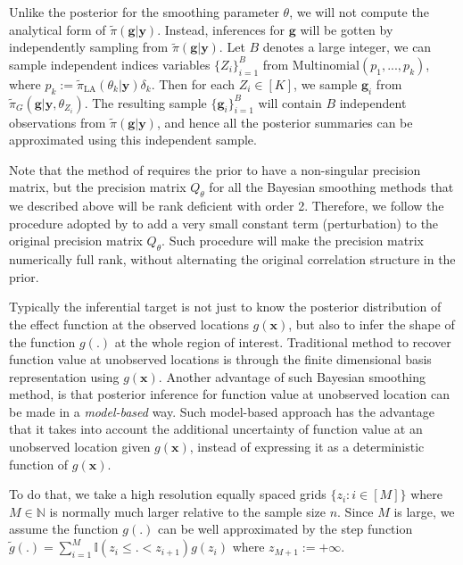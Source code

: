 \documentclass{article}
\begin{document}
Unlike the posterior for the smoothing parameter $\theta$, we will not compute the analytical form of $\tilde{\pi}(\boldsymbol{g}|\boldsymbol{y})$. Instead, inferences for $\boldsymbol{g}$ will be gotten by independently sampling from $\tilde{\pi}(\boldsymbol{g}|\boldsymbol{y})$. Let $B$ denotes a large integer, we can sample independent indices variables $\{Z_i\}_{i=1}^B$ from $\text{Multinomial}(p_1,...,p_k)$, where $p_k := \tilde{\pi}_\text{LA}(\theta_k|\boldsymbol{y}) \delta_k$. Then for each $Z_i \in [K]$, we sample $\boldsymbol{g}_i$ from $\tilde{\pi}_G(\boldsymbol{g}|\boldsymbol{y},\theta_{Z_i})$. The resulting sample $\{\boldsymbol{g}_i\}_{i=1}^B$ will contain $B$ independent observations from $\tilde{\pi}(\boldsymbol{g}|\boldsymbol{y})$, and hence all the posterior summaries can be approximated using this independent sample. 

Note that the method of \cite{tierney1986accurate} requires the prior to have a non-singular precision matrix, but the precision matrix $Q_\theta$ for all the Bayesian smoothing methods that we described above will be rank deficient with order 2. Therefore, we follow the procedure adopted by \cite{wood2011fast} to add a very small constant term (perturbation) to the original precision matrix $Q_\theta$. Such procedure will make the precision matrix numerically full rank, without alternating the original correlation structure in the prior.

Typically the inferential target is not just to know the posterior distribution of the effect function at the observed locations $g(\boldsymbol{x})$, but also to infer the shape of the function $g(.)$ at the whole region of interest. Traditional method to recover function value at unobserved locations is through the finite dimensional basis representation using $g(\boldsymbol{x})$. Another advantage of such Bayesian smoothing method, is that posterior inference for function value at unobserved location can be made in a \textit{model-based} way. Such model-based approach has the advantage that it takes into account the additional uncertainty of function value at an unobserved location given $g(\boldsymbol{x})$, instead of expressing it as a deterministic function of $g(\boldsymbol{x})$.

To do that, we take a high resolution equally spaced grids $\{z_i:i\in[M]\}$ where $M \in \mathbb{N}$ is normally much larger relative to the sample size $n$. Since $M$ is large, we assume the function $g(.)$ can be well approximated by the step function $\tilde{g}(.) = \sum_{i=1}^{M} \mathbb{I}(z_{i}\leq.< z_{i+1})g(z_i)$ where $z_{M+1} := +\infty$.
\end{document}
